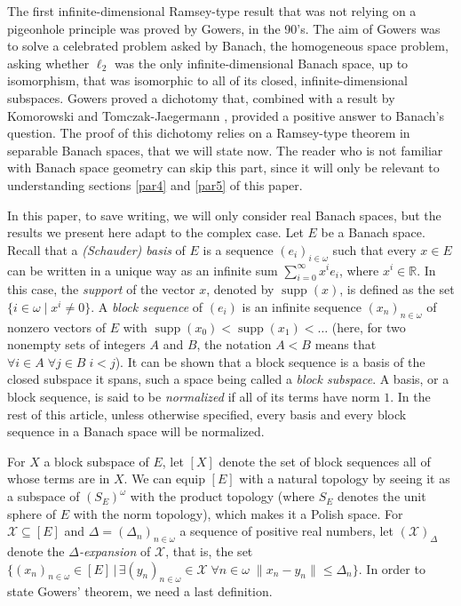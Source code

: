 \documentclass[a4paper,11pt]{article}
\theoremstyle{definition}
\numberwithin{equation}{section}
\newcommand{\R}{\mathbb{R}}
\newcommand{\X}{\mathcal{X}}
\DeclareMathOperator{\supp}{supp}
\begin{document}
\smallskip

The first infinite-dimensional Ramsey-type result that was not relying on a pigeonhole principle was proved by Gowers, in the 90's. The aim of Gowers was to solve a celebrated problem asked by Banach, the homogeneous space problem, asking whether $\ell_2$ was the only infinite-dimensional Banach space, up to isomorphism, that was isomorphic to all of its closed, infinite-dimensional subspaces. Gowers proved a dichotomy \cite{GowersRamsey} that, combined with a result by Komorowski and Tomczak-Jaegermann \cite{KomorowskiTomczakJaegermann}, provided a positive answer to Banach's question. The proof of this dichotomy relies on a Ramsey-type theorem in separable Banach spaces, that we will state now. The reader who is not familiar with Banach space geometry can skip this part, since it will only be relevant to understanding sections \ref{par4} and \ref{par5} of this paper.

\smallskip

In this paper, to save writing, we will only consider real Banach spaces, but the results we present here adapt to the complex case. Let $E$ be a Banach space. Recall that a \emph{(Schauder) basis} of $E$ is a sequence $(e_i)_{i \in \omega}$ such that every $x \in E$ can be written in a unique way as an infinite sum $\sum_{i = 0}^\infty x^i e_i$, where $x^i \in \R$. In this case, the \emph{support} of the vector $x$, denoted by $\supp(x)$, is defined as the set $\{i \in \omega \mid x^i \neq 0\}$. A \emph{block sequence} of $(e_i)$ is an infinite sequence $(x_n)_{n\in \omega}$ of nonzero vectors of $E$ with $\supp(x_0) < \supp(x_1) < \ldots$ (here, for two nonempty sets of integers $A$ and $B$, the notation $A < B$ means that $\forall i \in A \; \forall j \in B \; i < j$). It can be shown that a block sequence is a basis of the closed subspace it spans, such a space being called a \emph{block subspace}.  A basis, or a block sequence, is said to be \emph{normalized} if all of its terms have norm $1$. In the rest of this article, unless otherwise specified, every basis and every block sequence in a Banach space will be normalized.

\smallskip

For $X$ a block subspace of $E$, let $[X]$ denote the set of block sequences all of whose terms are in $X$. We can equip $[E]$ with a natural topology by seeing it as a subspace of $(S_E)^\omega$ with the product topology (where $S_E$ denotes the unit sphere of $E$ with the norm topology), which makes it a Polish space. For $\X \subseteq [E]$ and $\Delta = (\Delta_n)_{n \in \omega}$ a sequence of positive real numbers, let $(\X)_\Delta$ denote the \emph{$\Delta$-expansion} of $\X$, that is, the set $\{(x_n)_{n \in \omega} \in [E]\, | \,\exists (y_n)_{n \in \omega} \in \X \; \forall n \in \omega \; \|x_n - y_n\| \leqslant \Delta_n\}$. In order to state Gowers' theorem, we need a last definition.
\end{document}
